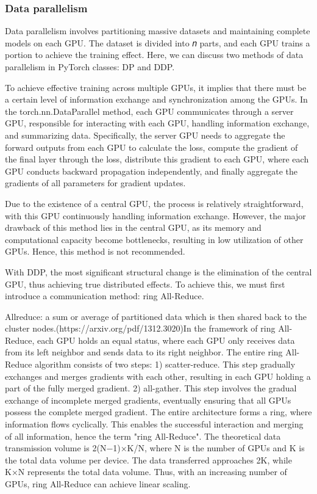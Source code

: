 \documentclass[conference]{IEEEtran}
\begin{document}
\subsubsection{Data parallelism}
Data parallelism involves partitioning massive datasets and maintaining complete models on each GPU. The dataset is divided into 𝑛 parts, and each GPU trains a portion to achieve the training effect. Here, we can discuss two methods of data parallelism in PyTorch classes: DP and DDP.

To achieve effective training across multiple GPUs, it implies that there must be a certain level of information exchange and synchronization among the GPUs. In the torch.nn.DataParallel method, each GPU communicates through a server GPU, responsible for interacting with each GPU, handling information exchange, and summarizing data. Specifically, the server GPU needs to aggregate the forward outputs from each GPU to calculate the loss, compute the gradient of the final layer through the loss, distribute this gradient to each GPU, where each GPU conducts backward propagation independently, and finally aggregate the gradients of all parameters for gradient updates.

Due to the existence of a central GPU, the process is relatively straightforward, with this GPU continuously handling information exchange.
However, the major drawback of this method lies in the central GPU, as its memory and computational capacity become bottlenecks, resulting in low utilization of other GPUs. Hence, this method is not recommended.

With DDP, the most significant structural change is the elimination of the central GPU, thus achieving true distributed effects. To achieve this, we must first introduce a communication method: ring All-Reduce.

Allreduce: a sum or average of partitioned data which is then shared back to the cluster nodes.(https://arxiv.org/pdf/1312.3020)In the framework of ring All-Reduce, each GPU holds an equal status, where each GPU only receives data from its left neighbor and sends data to its right neighbor. The entire ring All-Reduce algorithm consists of two steps:
1) scatter-reduce. This step gradually exchanges and merges gradients with each other, resulting in each GPU holding a part of the fully merged gradient. 2) all-gather. This step involves the gradual exchange of incomplete merged gradients, eventually ensuring that all GPUs possess the complete merged gradient.
The entire architecture forms a ring, where information flows cyclically. This enables the successful interaction and merging of all information, hence the term "ring All-Reduce". The theoretical data transmission volume is 2(N−1)×K/N​, where N is the number of GPUs and K is the total data volume per device. The data transferred approaches 2K, while K×N represents the total data volume. Thus, with an increasing number of GPUs, ring All-Reduce can achieve linear scaling.
\end{document}

